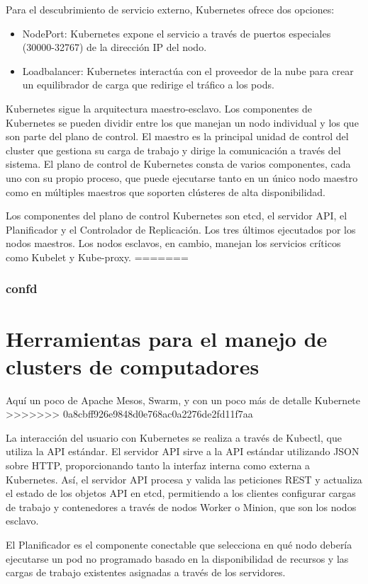 Para el descubrimiento de servicio externo, Kubernetes ofrece dos opciones:
\begin{itemize}
\item NodePort: Kubernetes expone el servicio a través de puertos especiales (30000-32767) de la dirección IP del nodo.
\item Loadbalancer: Kubernetes interactúa con el proveedor de la nube para crear un equilibrador de carga que redirige el tráfico a los pods.
\end{itemize}

Kubernetes sigue la arquitectura maestro-esclavo. Los componentes de Kubernetes se pueden dividir entre los que manejan un nodo individual y los que son parte del plano de control. El maestro es la principal unidad de control del cluster que gestiona su carga de trabajo y dirige la comunicación a través del sistema. El plano de control de Kubernetes consta de varios componentes, cada uno con su propio proceso, que puede ejecutarse tanto en un único nodo maestro como en múltiples maestros que soporten clústeres de alta disponibilidad.

Los componentes del plano de control Kubernetes son etcd, el servidor API, el Planificador y el Controlador de Replicación. Los tres últimos ejecutados por los nodos maestros. Los nodos esclavos, en cambio, manejan los servicios críticos como Kubelet y Kube-proxy.
=======
\subsubsection{confd}

\section{Herramientas para el manejo de clusters de computadores}
Aquí un poco de Apache Mesos, Swarm, y con un poco más de detalle Kubernete
>>>>>>> 0a8cbff926e9848d0e768ac0a2276de2fd11f7aa

La interacción del usuario con Kubernetes se realiza a través de Kubectl, que utiliza la API estándar. El servidor API sirve a la API estándar utilizando JSON sobre HTTP, proporcionando tanto la interfaz interna como externa a Kubernetes. Así, el servidor API procesa y valida las peticiones REST y actualiza el estado de los objetos API en etcd, permitiendo a los clientes configurar cargas de trabajo y contenedores a través de nodos Worker o Minion, que son los nodos esclavo. 

El Planificador es el componente conectable que selecciona en qué nodo debería ejecutarse un pod no programado basado en la disponibilidad de recursos y las cargas de trabajo existentes asignadas a través de los servidores.

